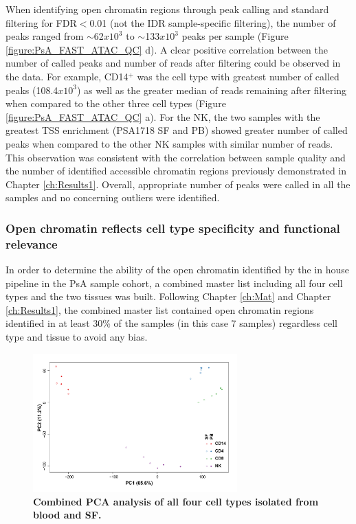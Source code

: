 When identifying open chromatin regions through peak calling and standard filtering for FDR$<$0.01 (not the IDR sample-specific filtering), the number of peaks ranged from $\sim$62$x10^3$ to $\sim$133$x10^3$ peaks per sample (Figure \ref{figure:PsA_FAST_ATAC_QC} d). A clear positive correlation between the number of called peaks and number of reads after filtering could be observed in the data. For example, CD14$^+$ was the cell type with greatest number of called peaks (108.4$x10^3$) as well as the greater median of reads remaining after filtering when compared to the other three cell types (Figure \ref{figure:PsA_FAST_ATAC_QC} a). For the NK, the two samples with the greatest TSS enrichment (PSA1718 SF and PB) showed greater number of called peaks when compared to the other NK samples with similar number of reads. This observation was consistent with the correlation between sample quality and the number of identified accessible chromatin regions previously demonstrated in Chapter \ref{ch:Results1}. Overall, appropriate number of peaks were called in all the samples and no concerning outliers were identified.



\subsubsection{Open chromatin reflects cell type specificity and functional relevance}
In order to determine the ability of the open chromatin identified by the in house pipeline in the PsA sample cohort, a combined master list including all four cell types and the two tissues was built. Following Chapter \ref{ch:Mat} and Chapter \ref{ch:Results1}, the combined master list contained open chromatin regions identified in at least 30\% of the samples (in this case 7 samples) regardless cell type and tissue to avoid any bias.

\begin{figure}[H]
\centering
\includegraphics[width=0.7\textwidth]{./Results3/pdfs/ATAC_PSA_all_DESEq2_PCA}
\caption[Combined PCA analysis of all four cell types isolated from blood and SF.]{\textbf{Combined PCA analysis of all four cell types isolated from blood and SF.}}
\label{figure:PsA_FAST_ATAC_PCA}
\end{figure}


